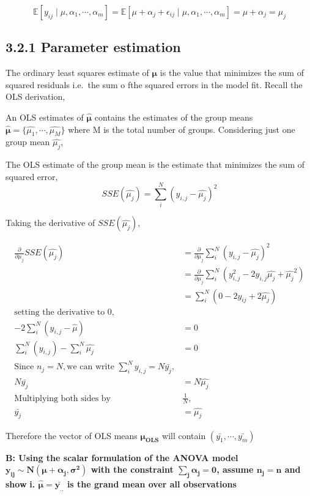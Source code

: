 \documentclass[12pt,]{article}
\begin{document}
\[\mathbb{E}[y_{ij} \mid \mu, \alpha_1, \cdots, \alpha_m] = \mathbb{E}[\mu + \alpha_j + \epsilon_{ij}\mid \mu, \alpha_1, \cdots, \alpha_m] = \mu + \alpha_j = \mu_j\]

\subsection{3.2.1 Parameter estimation}\label{parameter-estimation}

The ordinary least squares estimate of \(\pmb{\mu}\) is the value that
minimizes the sum of squared residuals i.e.~the sum o fthe squared
errors in the model fit. Recall the OLS derivation,

An OLS estimates of \(\pmb{\hat{\mu}}\) contains the estimates of the
group means \(\pmb{\hat{\mu}} = \{\hat{\mu_1}, \cdots, \hat{\mu_M}\}\)
where M is the total number of groups. Considering just one group mean
\(\hat{\mu_j}\),

The OLS estimate of the group mean is the estimate that minimizes the
sum of squared error,
\[SSE(\hat{\mu_j}) = \sum_i^N(y_{i,j} - \hat{\mu_j})^2\]

Taking the derivative of \(SSE(\hat{\mu_j})\),

\[
\begin{aligned}
\frac{\partial}{\partial \mu_j} SSE(\hat{\mu_j}) &= \frac{\partial}{\partial{\mu_j}} \sum_i^N (y_{i,j} - \hat{\mu_j})^2 \\ 
&= \frac{\partial}{\partial \mu_j}\sum_i^N (y_{i,j}^2 - 2y_{i,j} \hat{\mu_j} + \hat{\mu_j}^2)\\
&= \sum_i^N(0 - 2y_{ij}+ 2\hat{\mu_j})\\
\text{setting the derivative to 0, }\\
-2\sum_i^N (y_{i,j}  - \hat{\mu}) &= 0 \\ 
\sum_i^N (y_{i,j})  - \sum_i^N\hat{\mu_j} &= 0\\ 
\text{Since  } n_j = N, \text{we can write }\sum_i^Ny_{i,j} = N\bar{y_j}, \\
N\bar{y_j} &= N\hat{\mu_j}\\ 
\text{Multiplying both sides by }&\frac{1}{N}, \\
\bar{y_j} &= \hat{\mu_j} \
\end{aligned}
\]

Therefore the vector of OLS means \(\pmb{\mu_{OLS}}\) will contain
\((\bar{y_1}, \cdots, \bar{y_m})\)

\textbf{B: Using the scalar formulation of the ANOVA model $\pmb{y_{ij} \sim N(\mu + \alpha_j, \sigma^2)}$ with the constraint $\pmb{\sum_j \alpha_j = 0}$, assume $\pmb{n_j = n}$ and show}
\textbf{i. $\pmb{\hat{\mu} = \bar{y_{..}}}$ is the grand mean over all observations}
\end{document}
